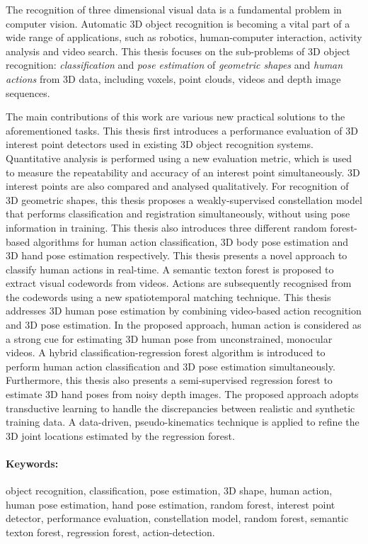 
The recognition of three dimensional visual data is a fundamental problem in computer vision.  Automatic 3D object recognition is becoming a vital part of a wide range of applications, such as robotics, human-computer interaction, activity analysis and video search. This thesis focuses on the sub-problems of 3D object recognition: \emph{classification} and \emph{pose estimation} of \emph{geometric shapes} and \emph{human actions} from 3D data, including voxels, point clouds, videos and depth image sequences.  

The main contributions of this work are various new practical solutions to the aforementioned tasks. 
This thesis first introduces a performance evaluation of 3D interest point detectors used in existing 3D object recognition systems. Quantitative analysis is performed using a new evaluation metric, which is used to measure the repeatability and accuracy of an interest point simultaneously. 3D interest points are also compared and analysed qualitatively. For recognition of 3D geometric shapes, this thesis proposes a weakly-supervised constellation model that performs classification and registration simultaneously, without using pose information in training. 
This thesis also introduces three different random forest-based algorithms for human action classification, 3D body pose estimation and 3D hand pose estimation respectively. 
This thesis presents a novel approach to classify human actions in real-time. A semantic texton forest is proposed to extract visual codewords from videos. Actions are subsequently recognised from the codewords using a new spatiotemporal matching technique. 
This thesis addresses 3D human pose estimation by combining video-based action recognition and 3D pose estimation. In the proposed approach, human action is considered as a strong cue for estimating 3D human pose from unconstrained, monocular videos. A hybrid classification-regression forest algorithm is introduced to perform human action classification and 3D pose estimation simultaneously.  
Furthermore, this thesis also presents a semi-supervised regression forest to estimate 3D hand poses from noisy depth images. The proposed approach adopts transductive learning to handle the discrepancies between realistic and synthetic training data. A data-driven, pseudo-kinematics technique is applied to refine the 3D joint locations estimated by the regression forest.  

\paragraph{Keywords:~} object recognition, classification, pose estimation, 3D shape, human action, human pose estimation, hand pose estimation, random forest, interest point detector, performance evaluation, constellation model, random forest, semantic texton forest, regression forest, action-detection. 



